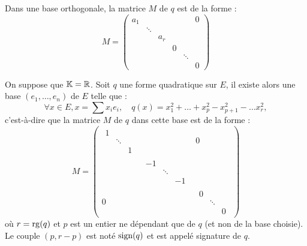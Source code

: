 \begin{rmq}
Dans une base orthogonale, la matrice $M$ de $q$ est de la forme :
\[ M = \begin{pmatrix}
a_1 & & & & & 0 \\
& \ddots & & & & \\
& & a_r & & & \\
& & & 0 & & \\
& & & & \ddots & \\
& & & & & 0
\end{pmatrix} \]
\end{rmq}

\begin{thm}[de Sylvester]
On suppose que $\mathbb{K} = \mathbb{R}$.
Soit $q$ une forme quadratique sur $E$, il existe alors une base $(e_1, \dots, e_n)$ de $E$ telle que :
\[ \forall x \in E, x = \sum x_i e_i, \quad q(x) = x_1^2 + \dots + x_p^2 - x_{p+1}^2 - \dots x_r^2 , \]
c'est-à-dire que la matrice $M$ de $q$ dans cette base est de la forme :
\[ M = \begin{pmatrix}
\begin{matrix} 1&&\\ &\ddots& \\&&1 \end{matrix} &&0 \\
& \begin{matrix} -1&&\\ &\ddots& \\&&-1 \end{matrix} & \\
0 && \begin{matrix} 0&&\\ &\ddots& \\&&0 \end{matrix}
\end{pmatrix} \]
où $r = \operatorname{rg}(q)$ et $p$ est un entier ne dépendant que de $q$ (et non de la base choisie).
Le couple $(p,r-p)$ est noté $\operatorname{sign}(q)$ et est appelé signature de $q$.
\end{thm}

